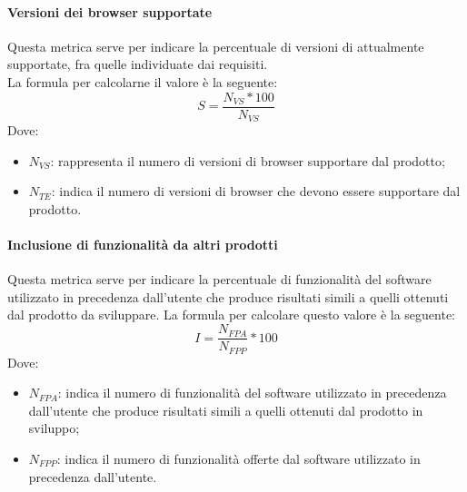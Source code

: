 \documentclass[../NormeDiProgetto.tex]{subfiles}
\begin{document}
			\paragraph{Versioni dei browser supportate}
				Questa metrica serve per indicare la percentuale di versioni di  attualmente supportate, fra quelle individuate dai requisiti. \\La formula per calcolarne il valore è la seguente:
					\begin{equation*}
						S = \frac{N_{VS} * 100}{N_{VS}}
					\end{equation*}
					Dove:
					\begin{itemize}
						\item \textbf{$N_{VS}$}: rappresenta il numero di versioni di browser supportare dal prodotto;
						\item \textbf{$N_{TE}$}: indica il numero di versioni di browser che devono essere supportare dal prodotto.
					\end{itemize}
					
			\paragraph{Inclusione di funzionalità da altri prodotti}
				Questa metrica serve per indicare la percentuale di funzionalità del software utilizzato in precedenza dall'utente che produce risultati simili a quelli ottenuti dal prodotto da sviluppare. La formula per calcolare questo valore è la seguente:
					\begin{equation*}
						I = \frac{N_{FPA}}{N_{FPP}} * 100
					\end{equation*}
					Dove:
					\begin{itemize}
						\item \textbf{$N_{FPA}$}: indica il numero di funzionalità del software utilizzato in precedenza dall'utente che produce risultati simili a quelli ottenuti dal prodotto in sviluppo;
						\item \textbf{$N_{FPP}$}: indica il numero di funzionalità offerte dal software utilizzato in precedenza dall'utente.
					\end{itemize}
            
            
\end{document}
